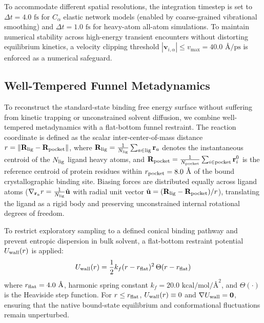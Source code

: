 \documentclass[journal=jpcbfk,manuscript=article,layout=twocolumn]{achemso}
\begin{document}
To accommodate different spatial resolutions, the integration timestep is set to $\Delta t = 4.0\text{ fs}$ for $C_\alpha$ elastic network models (enabled by coarse-grained vibrational smoothing) and $\Delta t = 1.0\text{ fs}$ for heavy-atom all-atom simulations. To maintain numerical stability across high-energy transient encounters without distorting equilibrium kinetics, a velocity clipping threshold $|\mathbf{v}_{i,\alpha}| \le v_{\max} = 40.0\text{ \AA/ps}$ is enforced as a numerical safeguard.

\subsection{Well-Tempered Funnel Metadynamics}
To reconstruct the standard-state binding free energy surface without suffering from kinetic trapping or unconstrained solvent diffusion, we combine well-tempered metadynamics with a flat-bottom funnel restraint.\cite{barducci2008well,limongelli2013funnel} The reaction coordinate is defined as the scalar inter-center-of-mass distance $r = \|\mathbf{R}_{\rm lig} - \mathbf{R}_{\rm pocket}\|$, where $\mathbf{R}_{\rm lig} = \frac{1}{N_{\rm lig}} \sum_{a \in \text{lig}} \mathbf{r}_a$ denotes the instantaneous centroid of the $N_{\rm lig}$ ligand heavy atoms, and $\mathbf{R}_{\rm pocket} = \frac{1}{N_{\rm pocket}} \sum_{i \in \text{pocket}} \mathbf{r}_i^0$ is the reference centroid of protein residues within $r_{\rm pocket} = 8.0\text{ \AA}$ of the bound crystallographic binding site. Biasing forces are distributed equally across ligand atoms ($\nabla_{\mathbf{r}_a} r = \frac{1}{N_{\rm lig}} \hat{\mathbf{u}}$ with radial unit vector $\hat{\mathbf{u}} = (\mathbf{R}_{\rm lig} - \mathbf{R}_{\rm pocket})/r$), translating the ligand as a rigid body and preserving unconstrained internal rotational degrees of freedom.

To restrict exploratory sampling to a defined conical binding pathway and prevent entropic dispersion in bulk solvent, a flat-bottom restraint potential $U_{\rm wall}(r)$ is applied:
\begin{equation}
U_{\rm wall}(r) = \frac{1}{2} k_f (r - r_{\rm flat})^2 \, \Theta(r - r_{\rm flat})
\end{equation}
where $r_{\rm flat} = 4.0\text{ \AA}$, harmonic spring constant $k_f = 20.0\text{ kcal/mol/\AA}^2$, and $\Theta(\cdot)$ is the Heaviside step function. For $r \le r_{\rm flat}$, $U_{\rm wall}(r) \equiv 0$ and $\nabla U_{\rm wall} = \mathbf{0}$, ensuring that the native bound-state equilibrium and conformational fluctuations remain unperturbed.
\end{document}
